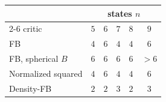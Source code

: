 \begin{tabular}{lccccc}
\toprule
& \multicolumn{5}{c}{states $n$} \\ \cmidrule(lr){2-6}
critic & $5$ & $6$ & $7$ & $8$ & $9$ \\
\midrule
FB & $4$ & $6$ & $4$ & $4$ & $6$ \\
FB, spherical $B$ & $6$ & $6$ & $6$ & $6$ & $>6$ \\
Normalized squared & $4$ & $6$ & $4$ & $4$ & $6$ \\
Density-FB & $2$ & $2$ & $3$ & $2$ & $3$ \\
\bottomrule
\end{tabular}
